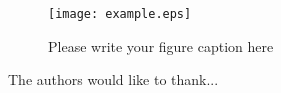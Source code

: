 \begin{figure}
  \texttt{[image: example.eps]}
\caption{Please write your figure caption here}
\label{fig:1}       %
\end{figure}



\begin{acknowledgements}
The authors would like to thank...
\end{acknowledgements}






